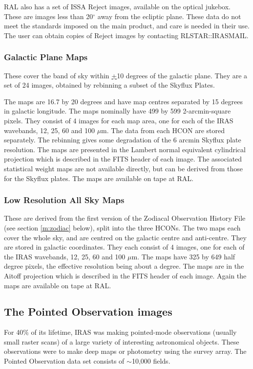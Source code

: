 RAL also has a set of ISSA Reject images, available on the optical jukebox.
These are images less than 20$^{\circ}$ away from the ecliptic plane. These
data do not meet the standards imposed on the main product, and care is needed
in their use.
The user can obtain copies of Reject images by contacting RLSTAR::IRASMAIL.

\subsubsection{Galactic Plane Maps}
These cover the band of sky within \underline{+}10 degrees of the galactic
plane.
They are a set of 24 images, obtained by rebinning a subset of the Skyflux
Plates.

The maps are 16.7 by 20 degrees and have map centres separated by 15 degrees in
galactic longitude.
The maps nominally have 499 by 599 2-arcmin-square pixels.
They consist of 4 images for each map area, one for each of the IRAS
wavebands, 12, 25, 60 and 100 $\mu$m.
The data from each HCON are stored separately.
The rebinning gives some degradation of the 6 arcmin Skyflux plate resolution.
The maps are presented in the Lambert normal equivalent cylindrical projection
which is described in the FITS header of each image.
The associated statistical weight maps are not available directly, but can be
derived from those for the Skyflux plates.
The maps are available on tape at RAL.

\subsubsection{Low Resolution All Sky Maps}
These are derived from the first version of the Zodiacal Observation History
File (see section \ref{m:zodiac} below), split into the three HCONs.
The two maps each cover the whole sky, and are centred on the galactic centre
and anti-centre.
They are stored in galactic coordinates.
They each consist of 4 images, one for each of the IRAS wavebands, 12, 25,
60 and 100 $\mu$m.
The maps have 325 by 649 half degree pixels, the effective resolution being
about a degree.
The maps are in the Aitoff projection which is described in the FITS header of
each image.
Again the maps are available on tape at RAL.

\subsection{The Pointed Observation images}
For 40\% of its lifetime, IRAS was making pointed-mode observations (usually
small raster scans) of a large variety of interesting astronomical objects.
These observations were to make deep maps or photometry using the survey array.
The Pointed Observation data set consists of $\sim$10,000 fields.


